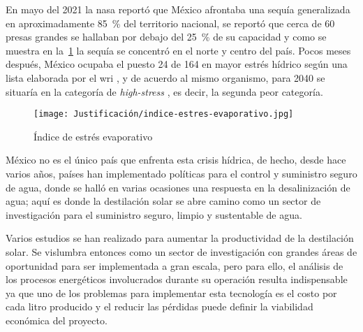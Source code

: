 	En mayo del 2021 la \acrfull{nasa} reportó que México afrontaba una sequía generalizada en aproximadamente \qty{85}{\percent} del territorio nacional, se reportó que cerca de 60 presas grandes se hallaban por debajo del \qty{25}{\percent} de su capacidad y como se muestra en la~\cref{fig:indice-estres-evaporativo} la sequía se concentró en el norte y centro del país. Pocos meses después, México ocupaba el puesto 24 de 164 en mayor estrés hídrico según una lista elaborada por el \acrshort{wri} \cite{efe_empeora_2021}, y de acuerdo al mismo organismo, para 2040 se situaría en la categoría de \textit{high-stress} \cite{maddocks_ranking_2015}, es decir, la segunda peor categoría.

	\begin{figure}[H]
		\centering
		\texttt{[image: Justificación/indice-estres-evaporativo.jpg]}
		\caption{Índice de estrés evaporativo}
		\label{fig:indice-estres-evaporativo}
	\end{figure}
	
	México no es el único país que enfrenta esta crisis hídrica, de hecho, desde hace varios años, países han implementado políticas para el control y suministro seguro de agua, donde se halló en varias ocasiones una respuesta en la desalinización de agua; aquí es donde la destilación solar se abre camino como un sector de investigación para el suministro seguro, limpio y sustentable de agua.
	
	Varios estudios se han realizado para aumentar la productividad de la destilación solar. Se vislumbra entonces como un sector de investigación con grandes áreas de oportunidad para ser implementada a gran escala, pero para ello, el análisis de los procesos energéticos involucrados durante su operación resulta indispensable ya que uno de los problemas para implementar esta tecnología es el costo por cada litro producido y el reducir las pérdidas puede definir la viabilidad económica del proyecto.
	
